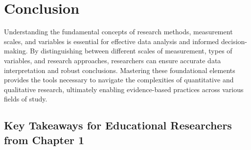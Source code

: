 \documentclass[
  letterpaper,
  DIV=11,
  numbers=noendperiod]{scrreprt}
\begin{document}

\chapter*{Conclusion}\label{conclusion}


Understanding the fundamental concepts of research methods, measurement
scales, and variables is essential for effective data analysis and
informed decision-making. By distinguishing between different scales of
measurement, types of variables, and research approaches, researchers
can ensure accurate data interpretation and robust conclusions.
Mastering these foundational elements provides the tools necessary to
navigate the complexities of quantitative and qualitative research,
ultimately enabling evidence-based practices across various fields of
study.

\section*{Key Takeaways for Educational Researchers from Chapter
1}\label{key-takeaways-for-educational-researchers-from-chapter-1}

\end{document}
